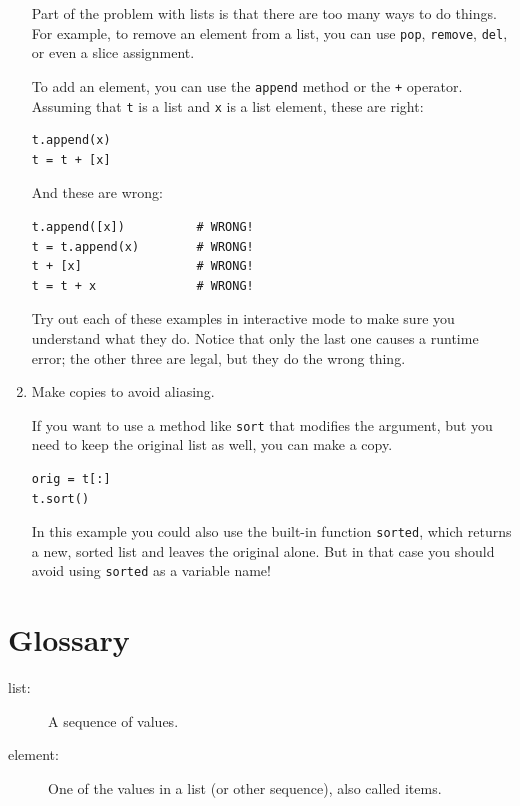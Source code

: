 \documentclass[10pt]{book}
\begin{document}
\begin{CJK}{UTF8}{gbsn}
\begin{enumerate}
Part of the problem with lists is that there are too many
ways to do things.  For example, to remove an element from
a list, you can use {\tt pop}, {\tt remove}, {\tt del},
or even a slice assignment.

To add an element, you can use the {\tt append} method or
the {\tt +} operator.  Assuming that {\tt t} is a list and
{\tt x} is a list element, these are right: 

\begin{verbatim}
t.append(x)
t = t + [x]
\end{verbatim}

And these are wrong:

\begin{verbatim}
t.append([x])          # WRONG!
t = t.append(x)        # WRONG!
t + [x]                # WRONG!
t = t + x              # WRONG!
\end{verbatim}

Try out each of these examples in interactive mode to make sure
you understand what they do.  Notice that only the last
one causes a runtime error; the other three are legal, but they
do the wrong thing.


\item Make copies to avoid aliasing.

If you want to use a method like {\tt sort} that modifies
the argument, but you need to keep the original list as
well, you can make a copy.

\begin{verbatim}
orig = t[:]
t.sort()
\end{verbatim}

In this example you could also use the built-in function {\tt sorted},
which returns a new, sorted list and leaves the original alone.
But in that case you should avoid using {\tt sorted} as a variable
name!

\end{enumerate}



\section{Glossary}

\begin{description}

\item[list:] A sequence of values.

\item[element:] One of the values in a list (or other sequence),
also called items.


\end{description}
\end{CJK}
\end{document}
